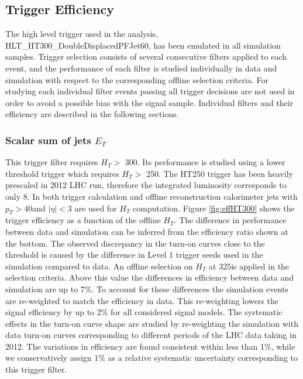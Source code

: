 \subsection{Trigger Efficiency}
\label{subsec:trigeff}

The high level trigger used in the analysis, HLT\_HT300\_DoubleDisplacedPFJet60, has been emulated in all
 simulation samples. Trigger selection consists of several consecutive filters applied to each event, 
and the performance of each filter is studied individually in data and simulation with respect to 
the corresponding offline selection criteria. For studying each individual filter events 
passing all trigger decisions 
are not used in order to avoid a possible bias with the signal sample. Individual filters and their efficiency are
described in the following sections.  

\subsubsection{Scalar sum of jets $E_T$}
\label{subsubsec:trigHT}
This trigger filter requires $H_T > $ 300\GeV. Its performance is studied using a lower threshold trigger which 
requires $H_T >$ 250\GeV. 
The HT250 trigger has been heavily prescaled in 2012 LHC run, therefore the integrated luminosity corresponds to only 8\pbinv. 
In both trigger calculation and offline reconstruction calorimeter jets with $p_T>$40\GeV and $|\eta|<$3 are used
 for $H_T$ computation. 
Figure \ref{fig:effHT300} shows the trigger efficiency as a function of the offline $H_T$. 
The difference in performance between data and simulation can be inferred from the efficiency ratio 
shown at the bottom. The observed discrepancy in the turn-on curves close to the threshold is caused by the 
difference in Level 1 trigger seeds used in the simulation compared to data.
An offline selection on 
$H_T$ at 325\GeV is applied in the selection criteria. 
Above this value the differences in efficiency between data and simulation are up to
7\%. To account for these differences the simulation events are re-weighted to match the efficiency in data.
This re-weighting
lowers the signal efficiency by up to 2\% for all considered signal models. The systematic effects in the turn-on
curve shape are studied by re-weighting the simulation with data turn-on curves corresponding to
 different periods of the LHC data taking in 2012. The variations in efficiency are found consistent within 
less than 1\%, while we conservatively assign 1\% as a relative 
systematic uncertainty corresponding to this trigger filter.      

